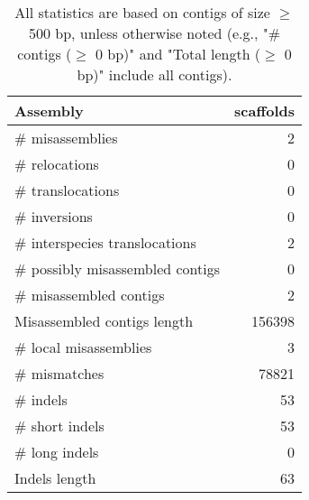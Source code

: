 \documentclass[12pt,a4paper]{article}
\begin{document}
\begin{table}[ht]
\begin{center}
\caption{All statistics are based on contigs of size $\geq$ 500 bp, unless otherwise noted (e.g., "\# contigs ($\geq$ 0 bp)" and "Total length ($\geq$ 0 bp)" include all contigs).}
\begin{tabular}{|l*{1}{|r}|}
\hline
Assembly & scaffolds \\ \hline
\# misassemblies & 2 \\ \hline
\hspace{5mm}\# relocations & 0 \\ \hline
\hspace{5mm}\# translocations & 0 \\ \hline
\hspace{5mm}\# inversions & 0 \\ \hline
\hspace{5mm}\# interspecies translocations & 2 \\ \hline
\# possibly misassembled contigs & 0 \\ \hline
\# misassembled contigs & 2 \\ \hline
Misassembled contigs length & 156398 \\ \hline
\# local misassemblies & 3 \\ \hline
\# mismatches & 78821 \\ \hline
\# indels & 53 \\ \hline
\hspace{5mm}\# short indels & 53 \\ \hline
\hspace{5mm}\# long indels & 0 \\ \hline
Indels length & 63 \\ \hline
\end{tabular}
\end{center}
\end{table}
\end{document}
